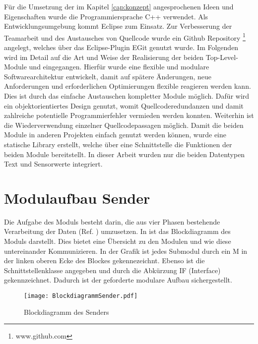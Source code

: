 \label{cap:implementierung}
F{\"u}r die Umsetzung der im Kapitel \ref{cap:konzept} angesprochenen Ideen und
Eigenschaften wurde die Programmiersprache C++ verwendet. Als Entwicklungsumgebung kommt
Eclipse zum Einsatz. Zur Verbesserung der Teamarbeit und des Austausches
von Quellcode wurde ein Github Repository \footnote{www.github.com} angelegt,
welches {\"u}ber das Eclipse-Plugin EGit genutzt wurde. \newline Im Folgenden wird
im Detail auf die Art und Weise der Realisierung der beiden Top-Level-Module
 und  eingegangen. Hierf{\"u}r wurde eine flexible und
modulare Softwarearchitektur entwickelt, damit auf sp{\"a}tere {\"A}nderungen, neue Anforderungen
und erforderlichen Optimierungen flexible reagieren werden kann. Dies ist durch
das einfache Austauschen kompletter Module m{\"o}glich.
Daf{\"u}r wird ein objektorientiertes Design genutzt, womit Quellcoderedundanzen und damit
zahlreiche potentielle Programmierfehler vermieden werden konnten.
Weiterhin ist die Wiederverwendung einzelner Quellcodepassagen m{\"o}glich.\newline
Damit die beiden Module in anderen Projekten einfach genutzt werden k{\"o}nnen,
wurde eine statische Library erstellt, welche {\"u}ber eine Schnittstelle die Funktionen
der beiden Module bereitstellt. In dieser Arbeit wurden nur die beiden
Datentypen Text und Sensorwerte integriert.

\section{Modulaufbau Sender}
 
Die Aufgabe des Moduls  besteht darin, die aus vier Phasen
bestehende Verarbeitung der Daten (Ref. \cite{Daher}) umzusetzen.
In  ist das Blockdiagramm des Moduls 
darstellt.
Dies bietet eine {\"U}bersicht zu den Modulen und wie diese untereinander 
Kommunizieren. In der Grafik ist jedes Submodul durch ein M in der linken
oberen Ecke des Blockes gekennezeichnt. Ebenso ist die Schnittstellenklasse angegeben
und durch die Abk{\"u}rzung \gls{IF} (Interface) gekennzeichnet. Dadurch ist der
geforderte modulare Aufbau sichergestellt.

\begin{figure}[H]
\centering
\texttt{[image: BlockdiagrammSender.pdf]} %
\caption{Blockdiagramm des Senders}
\label{fig:BlockdiagrammSender}
\end{figure}

